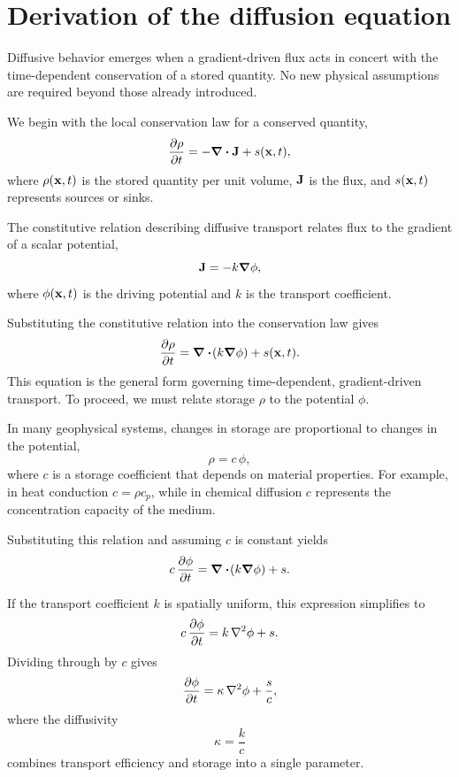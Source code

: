 \section{Derivation of the diffusion equation}

Diffusive behavior emerges when a gradient-driven flux acts in concert with the time-dependent conservation of a stored quantity. No new physical assumptions are required beyond those already introduced.

We begin with the local conservation law for a conserved quantity,
\begin{equation}
    \pdv{\rho}{t} = -\div \vb{J} + s(\vb{x},t),
\end{equation}
where $\rho(\vb{x},t)$ is the stored quantity per unit volume, $\vb{J}$ is the flux, and $s(\vb{x},t)$ represents sources or sinks.

The constitutive relation describing diffusive transport relates flux to the gradient of a scalar potential,
\begin{equation}
    \vb{J} = -k \grad \phi,
\end{equation}
where $\phi(\vb{x},t)$ is the driving potential and $k$ is the transport coefficient.

Substituting the constitutive relation into the conservation law gives
\begin{equation}
    \pdv{\rho}{t} = \div\!\left(k \grad \phi\right) + s(\vb{x},t).
\end{equation}
This equation is the general form governing time-dependent, gradient-driven transport.  To proceed, we must relate storage $\rho$ to the potential $\phi$.

In many geophysical systems, changes in storage are proportional to changes in the potential,
\[
    \rho = c\,\phi,
\]
where $c$ is a storage coefficient that depends on material properties. For example, in heat conduction $c = \rho c_p$, while in chemical diffusion $c$ represents the concentration capacity of the medium.

Substituting this relation and assuming $c$ is constant yields
\begin{equation}
    c\,\pdv{\phi}{t} = \div\!\left(k \grad \phi\right) + s.
\end{equation}

If the transport coefficient $k$ is spatially uniform, this expression simplifies to
\begin{equation}
    c\,\pdv{\phi}{t} = k\,\laplacian \phi + s.
\end{equation}
Dividing through by $c$ gives
\begin{equation}
    \pdv{\phi}{t} = \kappa\,\laplacian \phi + \frac{s}{c},
    \label{eq:diffusion}
\end{equation}
where the diffusivity
\begin{equation}
    \kappa = \frac{k}{c}
\end{equation}
combines transport efficiency and storage into a single parameter.

